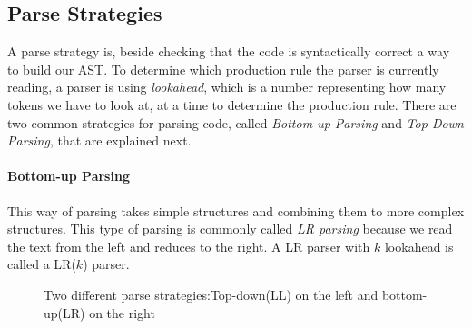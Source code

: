 	\subsection{Parse Strategies}\label{impl:parsestrats}
		A parse strategy is, beside checking that the code is syntactically correct a way to build our AST. 
		To determine which production rule the parser is currently reading, 
		a parser is using {\it lookahead}, which is a number representing how many tokens we have to look at, 
		at a time to determine the production rule.
		There are two common strategies for parsing code, called {\it Bottom-up Parsing} and {\it Top-Down Parsing}, that are explained next.
	\paragraph{Bottom-up Parsing}
		This way of parsing takes simple structures and combining them to more complex structures.
		This type of parsing is commonly called {\it LR parsing} because we read the text from the left and reduces to the right.
		A LR parser with $k$ lookahead is called a LR($k$) parser.
		\begin{figure}[H]
			\centering
			\caption{Two different parse strategies:Top-down(LL) on the left and bottom-up(LR) on the right}\label{fig:parsers}
		\end{figure}
		
